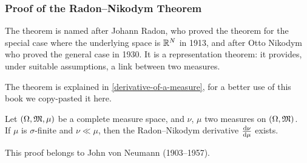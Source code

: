 \subsubsection{Proof of the Radon--Nikodym Theorem} \label{proof-radon-nikodym}
The theorem is named after Johann Radon, who proved the theorem for the special case where the underlying space is $\mathbb R^{N}$ in 1913, and after Otto Nikodym who proved the general case in 1930. It is a representation theorem: it provides, under suitable assumptions, a link between two measures.

The theorem is explained in \vref{derivative-of-a-measure}, for a better use of this book we copy-pasted it here.  
\begin{theo} 
	Let $(\Omega, \mathfrak M,\mu)$ be a complete measure space, and $\nu$, $\mu$ two measures on $(\Omega, \mathfrak M)$.\\
	If $\mu$ is $\sigma$-finite and $\nu\ll\mu$, then the Radon--Nikodym derivative $\frac{\mathrm d\nu}{\mathrm d\mu}$ exists.
\end{theo} 

This proof belongs to John von Neumann (1903--1957).

